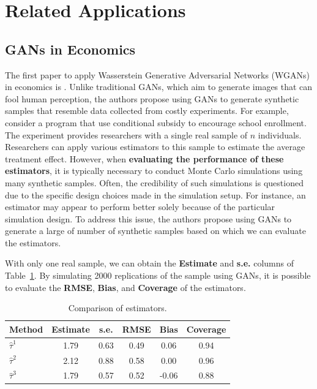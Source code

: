 \documentclass[12pt]{article}
\begin{document}
\section{Related Applications} \label{sec:related_applications}

\subsection{GANs in Economics}
The first paper to apply Wasserstein Generative Adversarial Networks (WGANs) in
economics is \citet{athey2024using}. Unlike traditional GANs, which aim to
generate images that can fool human perception, the authors propose using GANs
to generate synthetic samples that resemble data collected from costly
experiments. For example, consider a program that use conditional subsidy to
encourage school enrollment. The experiment provides researchers with a single
real sample of \(n\) individuals. Researchers can apply various estimators to
this sample to estimate the average treatment effect. However, when
\textbf{evaluating the performance of these estimators}, it is typically
necessary to conduct Monte Carlo simulations using many synthetic samples.
Often, the credibility of such simulations is questioned due to the specific
design choices made in the simulation setup. For instance, an estimator may
appear to perform better solely because of the particular simulation design. To
address this issue, the authors propose using GANs to generate a large of
number of synthetic samples based on which we can evaluate the estimators.

With only one real sample, we can obtain the \textbf{Estimate} and
\textbf{s.e.} columns of Table~\ref{tab:estimator_comparison}. By simulating
2000 replications of the sample using GANs, it is possible to evaluate the
\textbf{RMSE}, \textbf{Bias}, and \textbf{Coverage} of the estimators.

\begin{table}[h!]
    \centering
    \begin{tabular}{|l|c|c|c|c|c|}
        \hline
        \textbf{Method} & \textbf{Estimate} & \textbf{s.e.} & \textbf{RMSE} & \textbf{Bias} & \textbf{Coverage} \\
        \hline
        $\hat{\tau}^1$  & 1.79              & 0.63          & 0.49          & 0.06          & 0.94              \\
        $\hat{\tau}^2$  & 2.12              & 0.88          & 0.58          & 0.00          & 0.96              \\
        $\hat{\tau}^3$  & 1.79              & 0.57          & 0.52          & -0.06         & 0.88              \\
        \hline
    \end{tabular}
    \caption{Comparison of estimators.}
    \label{tab:estimator_comparison}
\end{table}
\end{document}
